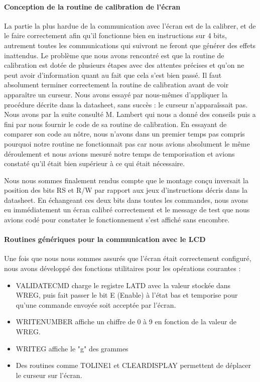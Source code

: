 \documentclass[a4paper,11pt,titlepage]{article}
\begin{document}
\paragraph{Conception de la routine de calibration de l'écran}
La partie la plus hardue de la communication avec l'écran est de la calibrer, et de le faire correctement afin qu'il fonctionne bien en instructions sur 4 bits, autrement toutes les communications qui suivront ne feront que générer des effets inattendus. Le problème que nous avons rencontré est que la routine de calibration est dotée de plusieurs étapes avec des attentes précises et qu'on ne peut avoir d'information quant au fait que cela s'est bien passé. Il faut absolument terminer correctement la routine de calibration avant de voir apparaître un curseur.
Nous avons essayé par nous-mêmes d'appliquer la procédure décrite dans la datasheet, sans succès : le curseur n'apparaîssait pas.
Nous avons par la suite consulté M. Lambert qui nous a donné des conseils puis a fini par nous fournir le code de sa routine de calibration. En essayant de comparer son code au nôtre, nous n'avons dans un premier temps pas compris pourquoi notre routine ne fonctionnait pas car nous avions absolument le même déroulement et nous avions mesuré notre temps de temporisation et avions constaté qu'il était bien supérieur à ce qui était nécessaire.

Nous nous sommes finalement rendus compte que le montage conçu inversait la position des bits RS et R/W par rapport aux jeux d'instructions décris dans la datasheet. En échangeant ces deux bits dans toutes les commandes, nous avons eu immédiatement un écran calibré correctement et le message de test que nous avions codé pour constater le fonctionnement s'est affiché sans encombre.

\paragraph{Routines génériques pour la communication avec le LCD}

Une fois que nous nous sommes assurés que l'écran était correctement configuré, nous avons développé des fonctions utilitaires pour les opérations courantes :
\begin{itemize}
  \item VALIDATECMD charge le registre LATD avec la valeur stockée dans WREG, puis fait passer le bit E (Enable) à l'état bas et temporise pour qu'une commande envoyée soit acceptée par l'écran.
  \item WRITENUMBER affiche un chiffre de 0 à 9 en fonction de la valeur de WREG.
  \item WRITEG affiche le "g" des grammes
  \item Des routines comme TOLINE1 et CLEARDISPLAY permettent de déplacer le curseur sur l'écran.
\end{itemize}
\end{document}
